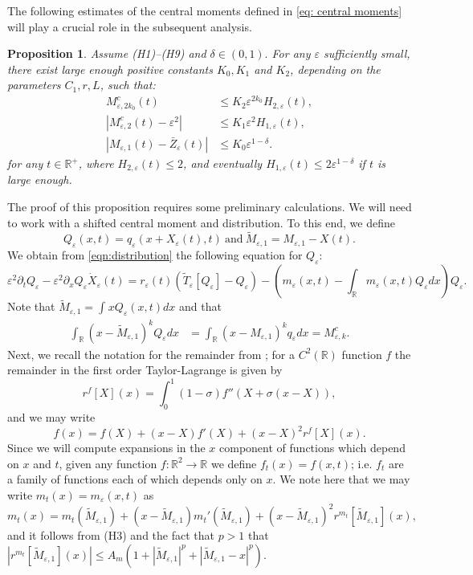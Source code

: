 \documentclass[]{article}
\newtheorem{proposition}{Proposition}
\theoremstyle{remark}
\begin{document}
The following estimates of the central moments defined in \eqref{eq: central moments} will play a crucial role in the subsequent analysis.
\begin{proposition}
\label{thm:MomentEstimates}
Assume (H1)--(H9) and $\delta \in (0,1).$   For any $\varepsilon$ sufficiently small,  there exist large enough positive constants $K_0,K_1$ and $K_2$,  depending on the parameters $C_1,r,L$, such that:
\begin{align}
 \label{eqn:M2kclose} M^{c}_{\varepsilon,2k_0}(t) &  \leq  K_{2} \varepsilon^{2k_0}H_{2,\varepsilon}(t), \\
\label{eqn:M2close} 
 \left | M_{\varepsilon,2}^{c}(t) -  \varepsilon^2  \right| & \leq  K_1\varepsilon^2 H_{1,\varepsilon}(t), \\
\label{eqn:M1close} \left| M_{\varepsilon,1}(t) - \bar{Z}_{\varepsilon}(t) \right|  & \leq  K_0 \varepsilon^{1-{\delta}}. 
\end{align}
for any $t \in \mathbb R^+$,  where $H_{2,\varepsilon}(t)\leq{}2$, and eventually $H_{1,\varepsilon}(t)\leq{}2\varepsilon^{1-\delta}$ if $t$ is large enough.
\end{proposition} 
The proof of this proposition requires some preliminary calculations. We will need to work with a shifted central moment and distribution. To this end, we define  
\[
Q_\varepsilon(x,t)=q_\varepsilon(x+X_\varepsilon(t),t)~\text{and}~\widetilde{M}_{\varepsilon,1}=M_{\varepsilon,1}-X(t).
\]
We obtain from \eqref{eqn:distribution} the following equation for $Q_\varepsilon$:
\begin{equation} \label{eqn:distribution_shift}
\varepsilon^2 \partial_t Q_\varepsilon-\varepsilon^2\partial_{x}Q_\varepsilon{}\dot{X}_\varepsilon(t) = r_\varepsilon(t)\left(\widetilde T_{\varepsilon}[Q_\varepsilon] - Q_\varepsilon \right) 
-  \left( m_\varepsilon(x,t)  - \int_{\mathbb R} m_\varepsilon(x,t)Q_\varepsilon dx \right) Q_\varepsilon.
\end{equation}
 Note that $\widetilde{M}_{\varepsilon,1}=\int_{}xQ_\varepsilon(x,t)dx$ and that \begin{align*}
     \int_{\mathbb{R}}(x-\widetilde{M}_{\varepsilon,1})^kQ_\varepsilon{}dx&=\int_{\mathbb{R}}(x-{M}_{\varepsilon,1})^kq_\varepsilon{}dx= M_{\varepsilon,k}^c.
 \end{align*}
Next, we recall the notation for the remainder from \cite{GHM}; for a $C^2(\mathbb{R})$ function $f$ the remainder in the first order Taylor-Lagrange is given by
    \[r^{f}[X](x)=\int_{0}^{1}(1-\sigma)f''(X+\sigma(x-X)),\]
    and we may write
    \[f(x)=f(X)+(x-X)f'(X)+(x-X)^2r^f[X](x).\]
Since we will compute expansions in the $x$ component of functions which depend on $x$ and $t$, given any function $f:\mathbb{R}^2\to{}\mathbb{R}$ we define $f_t(x)=f(x,t)$; i.e. $f_t$ are a family of functions each of which depends only on $x$.  We note here that we may write 
$m_t(x)=m_\varepsilon(x,t)$ as
\[m_t(x)=m_t(\widetilde{M}_{\varepsilon,1})+(x-\widetilde{M}_{\varepsilon,1})m_t'(\widetilde{M}_{\varepsilon,1})+(x-\widetilde{M}_{\varepsilon,1})^2r^{m_t}[\widetilde{M}_{\varepsilon,1}](x),\]
and it follows from (H3) and the fact that $p>1$ that $|r^{m_t}[\widetilde{M}_{\varepsilon,1}](x)|\leq{}A_m(1+|\widetilde{M}_{\varepsilon,1}|^p+|\widetilde{M}_{\varepsilon,1}-x|^p)$.
\end{document}

